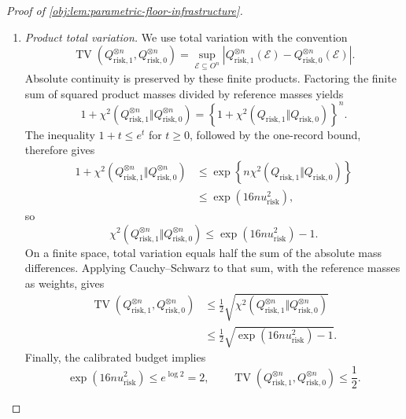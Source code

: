 \documentclass[11pt]{article}
\begin{document}
\begin{proof}[Proof of \cref{obj:lem:parametric-floor-infrastructure}]
\begin{enumerate}
\item \emph{Product total variation.}
We use total variation with the convention
\[
\operatorname{TV}
 (Q_{\mathrm{risk},1}^{\otimes n},Q_{\mathrm{risk},0}^{\otimes n})
=
\sup_{\mathcal E\subseteq O^n}
\left|
Q_{\mathrm{risk},1}^{\otimes n}(\mathcal E)
-
Q_{\mathrm{risk},0}^{\otimes n}(\mathcal E)
\right|.
\]
Absolute continuity is preserved by these finite products. Factoring the finite sum of squared product masses divided by reference masses yields
\[
1+\chi^2
 (Q_{\mathrm{risk},1}^{\otimes n}\Vert Q_{\mathrm{risk},0}^{\otimes n})
=
\left\{
1+\chi^2(Q_{\mathrm{risk},1}\Vert Q_{\mathrm{risk},0})
\right\}^{n}.
\]
The inequality \(1+t\le e^t\) for \(t\ge0\), followed by the one-record bound, therefore gives
\[
\begin{aligned}
1+\chi^2
 (Q_{\mathrm{risk},1}^{\otimes n}\Vert Q_{\mathrm{risk},0}^{\otimes n})
&\le
\exp\!\left\{
n\chi^2(Q_{\mathrm{risk},1}\Vert Q_{\mathrm{risk},0})
\right\}\\
&\le \exp(16n u_{\mathrm{risk}}^2),
\end{aligned}
\]
so
\[
\chi^2
 (Q_{\mathrm{risk},1}^{\otimes n}\Vert Q_{\mathrm{risk},0}^{\otimes n})
\le \exp(16n u_{\mathrm{risk}}^2)-1.
\]
On a finite space, total variation equals half the sum of the absolute mass differences. Applying Cauchy--Schwarz to that sum, with the reference masses as weights, gives
\[
\begin{aligned}
\operatorname{TV}
 (Q_{\mathrm{risk},1}^{\otimes n},Q_{\mathrm{risk},0}^{\otimes n})
&\le
\frac12\sqrt{
\chi^2
 (Q_{\mathrm{risk},1}^{\otimes n}\Vert Q_{\mathrm{risk},0}^{\otimes n})
}\\
&\le
\frac12\sqrt{\exp(16n u_{\mathrm{risk}}^2)-1}.
\end{aligned}
\]
Finally, the calibrated budget implies
\[
\exp(16n u_{\mathrm{risk}}^2)\le e^{\log 2}=2,
\qquad
\operatorname{TV}
 (Q_{\mathrm{risk},1}^{\otimes n},Q_{\mathrm{risk},0}^{\otimes n})
\le\frac12.
\]


\end{enumerate}
\end{proof}
\end{document}
